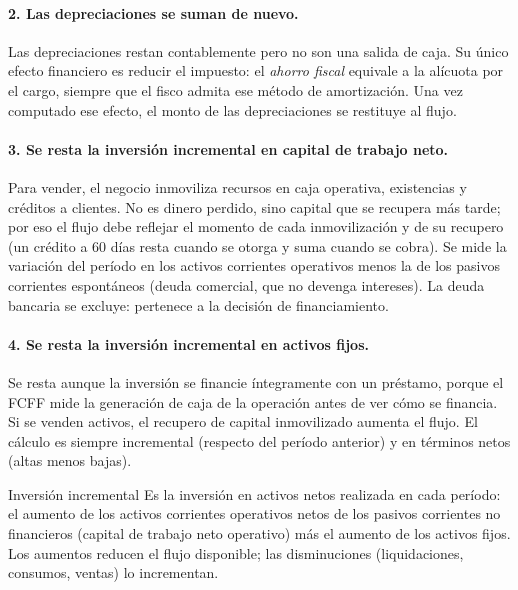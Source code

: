 \paragraph{2. Las depreciaciones se suman de nuevo.} Las depreciaciones restan contablemente pero no son una salida de caja. Su único efecto financiero es reducir el impuesto: el \emph{ahorro fiscal} equivale a la alícuota por el cargo, siempre que el fisco admita ese método de amortización. Una vez computado ese efecto, el monto de las depreciaciones se restituye al flujo.

\paragraph{3. Se resta la inversión incremental en capital de trabajo neto.} Para vender, el negocio inmoviliza recursos en caja operativa, existencias y créditos a clientes. No es dinero perdido, sino capital que se recupera más tarde; por eso el flujo debe reflejar el momento de cada inmovilización y de su recupero (un crédito a 60 días resta cuando se otorga y suma cuando se cobra). Se mide la variación del período en los activos corrientes operativos menos la de los pasivos corrientes espontáneos (deuda comercial, que no devenga intereses). La deuda bancaria se excluye: pertenece a la decisión de financiamiento.

\paragraph{4. Se resta la inversión incremental en activos fijos.} Se resta aunque la inversión se financie íntegramente con un préstamo, porque el FCFF mide la generación de caja de la operación antes de ver cómo se financia. Si se venden activos, el recupero de capital inmovilizado aumenta el flujo. El cálculo es siempre incremental (respecto del período anterior) y en términos netos (altas menos bajas).

\begin{definicion}{Inversión incremental}
Es la inversión en activos netos realizada en cada período: el aumento de los activos corrientes operativos netos de los pasivos corrientes no financieros (capital de trabajo neto operativo) más el aumento de los activos fijos. Los aumentos reducen el flujo disponible; las disminuciones (liquidaciones, consumos, ventas) lo incrementan.
\end{definicion}

